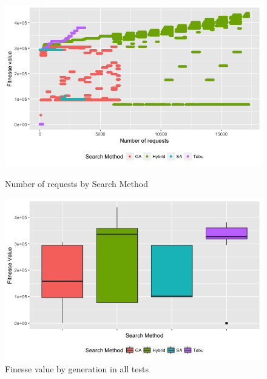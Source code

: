 \begin{figure}[h]
\begin{minipage}{.5\textwidth}
\centering
\includegraphics[width=1\textwidth]{./images/experiment2-1.png}
\caption{Number of requests by Search Method}
\label{fig:numberofrequestsbysearchmethod2}
\end{minipage}
\begin{minipage}{.5\textwidth}
\centering
\includegraphics[width=1\textwidth]{./images/experiment2-2.png}
\caption{Finesse value by generation in all tests}
\label{fig:boxplot2}
\end{minipage}

\end{figure}



